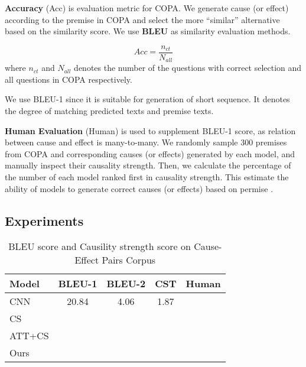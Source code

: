 \textbf{Accuracy} (Acc) is evaluation metric for COPA.
We generate cause (or effect) according to the premise in COPA
and select the more ``similar'' alternative based on the similarity
score. We use \textbf{BLEU} as similarity evaluation methods.

\begin{equation}
Acc = \frac{n_{ct}}{N_{all}}
\end{equation}
where $n_{ct}$ and $N_{all}$ denotes
the number of the questions with correct selection
and all questions in COPA respectively.

We use BLEU-1 since it is suitable for generation
of short sequence. It denotes the degree of matching 
predicted texts and premise texts. 

\textbf{Human Evaluation} (Human) is used to supplement
BLEU-1 score, as relation between cause and effect is many-to-many.
We randomly sample 300 premises from COPA and 
corresponding causes (or effects) generated
by each model, and manually inspect their causality strength.
Then, we calculate the percentage of the number of each model ranked 
first in causality strength. This estimate the 
ability of models to generate correct causes (or effects) based on permise .

\subsection{Experiments}
\label{sec:exp}

\begin{table}[th]
	\centering
    \small
	\begin{tabular}{|l|c|c|c|c|}
		\hline
		Model &   BLEU-1  & BLEU-2 & CST & Human \\
		\hline
		CNN & 20.84 & 4.06 & 1.87 & \\
		CS  & & & & \\
		ATT+CS & & & & \\
		\hline
		Ours & & & & \\
		\hline
	\end{tabular}
	\caption{BLEU score and Causility strength score on Cause-Effect Pairs Corpus}
	\label{tab:novel}
\end{table}

